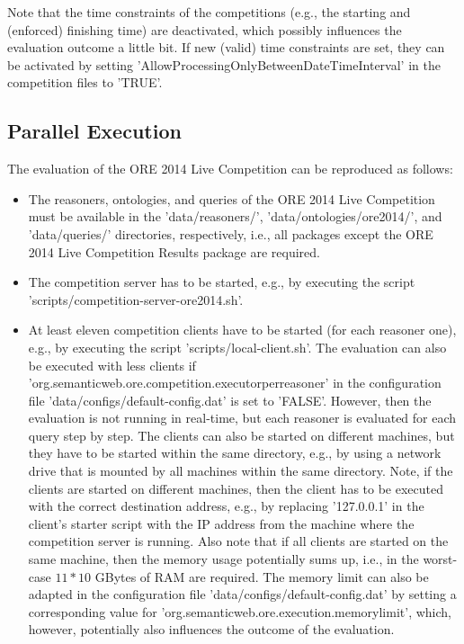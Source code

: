 \documentclass{article}
\begin{document}
Note that the time constraints of the competitions (e.g., the starting and (enforced) finishing time) are deactivated, which possibly influences the evaluation outcome a little bit.
If new (valid) time constraints are set, they can be activated by setting 'AllowProcessingOnlyBetweenDateTimeInterval' in the competition files to 'TRUE'.



\subsection{Parallel Execution}

The evaluation of the ORE 2014 Live Competition can be reproduced as follows:
\begin{itemize}
\item The reasoners, ontologies, and queries of the ORE 2014 Live Competition must be available in the 'data/reasoners/', 'data/ontologies/ore2014/', and 'data/queries/' directories, respectively, i.e., all packages except the ORE 2014 Live Competition Results package are required.
\item The competition server has to be started, e.g., by executing the script 'scripts/competition-server-ore2014.sh'.
\item At least eleven competition clients have to be started (for each reasoner one), e.g., by executing the script 'scripts/local-client.sh'. 
The evaluation can also be executed with less clients if 'org.semanticweb.ore.competition.executorperreasoner' in the configuration file 'data/configs/default-config.dat' is set to 'FALSE'.
However, then the evaluation is not running in real-time, but each reasoner is evaluated for each query step by step.
The clients can also be started on different machines, but they have to be started within the same directory, e.g., by using a network drive that is mounted by all machines within the same directory. 
Note, if the clients are started on different machines, then the client has to be executed with the correct destination address, e.g., by replacing '127.0.0.1' in the client's starter script with the IP address from the machine where the competition server is running.
Also note that if all clients are started on the same machine, then the memory usage potentially sums up, i.e., in the worst-case $11*10$ GBytes of RAM are required. 
The memory limit can also be adapted in the configuration file 'data/configs/default-config.dat' by setting a corresponding value for 'org.semanticweb.ore.execution.memorylimit', which, however, potentially also influences the outcome of the evaluation.

\end{itemize}
\end{document}
